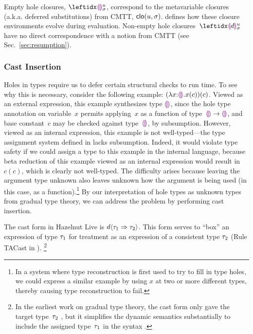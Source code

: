 Empty hole closures, $\dehole{u}{\sigma}{}$,  correspond to the metavariable closures (a.k.a. deferred substitutions) from CMTT, $\mathsf{clo}(u, \sigma)$.
%
 defines how these closure environments evolve during evaluation.
%
Non-empty hole closures~$\dhole{d}{u}{\sigma}{}$ have no direct correspondence with a notion from CMTT (see Sec.~\ref{sec:resumption}).

\subsubsection{Cast Insertion}\label{sec:cast-insertion}
%
%
Holes in types require us to defer certain structural checks to run time. 
%
To see why this is necessary, consider the following
example: $(\lambda x{:}\textcolor{violet}{\llparenthesis}\textcolor{violet}{\rrparenthesis}.x(c))(c)$.
%
Viewed as an external expression, this example synthesizes type
$\textcolor{violet}{\llparenthesis}\textcolor{violet}{\rrparenthesis}$, since the hole type annotation on variable~$x$ permits
applying~$x$ as a function of type~$\textcolor{violet}{\llparenthesis}\textcolor{violet}{\rrparenthesis} \rightarrow \textcolor{violet}{\llparenthesis}\textcolor{violet}{\rrparenthesis}$, and base
constant~$c$ may be checked against type~$\textcolor{violet}{\llparenthesis}\textcolor{violet}{\rrparenthesis}$, by subsumption.
%
However, viewed as an internal expression, this example is not
well-typed---the type assignment system defined in
 lacks subsumption.
%
Indeed, it would violate type safety if we could assign a type to this
example in the internal language, because beta reduction of this
example viewed as an internal expression would result in $c(c)$, which
is clearly not well-typed.
%
The difficulty arises because leaving the argument type unknown also leaves unknown how
the argument is being used (in this case, as a function).\footnote{In a system where type reconstruction is first used
to try to fill in type holes, we could express a similar example by
using $x$ at two or more different types, thereby causing type
reconstruction to fail.
%
}
By our interpretation of hole types as unknown types from gradual type
theory, we can address the problem by performing cast insertion.
%

The cast form in Hazelnut Live is $d \langle{\tau_1}\Rightarrow{\tau_2}\rangle$.
%
This form serves to ``box'' an expression of type $\tau_1$ for
treatment as an expression of a consistent type $\tau_2$
(Rule TACast in ).%
\footnote{
In the earliest work on gradual type theory, the cast form only gave
the target type~$\tau_2$ \cite{Siek06a}, but it simplifies the dynamic semantics substantially
to include the assigned type~$\tau_1$ in the syntax \cite{DBLP:conf/snapl/SiekVCB15}.
}

